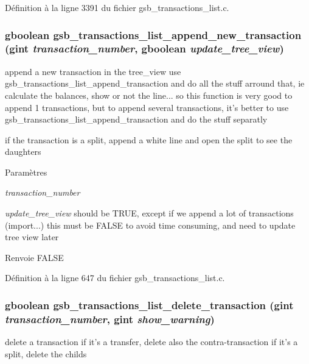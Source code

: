 Définition à la ligne 3391 du fichier gsb\_\-transactions\_\-list.c.

\subsubsection[{gsb\_\-transactions\_\-list\_\-append\_\-new\_\-transaction}]{\setlength{\rightskip}{0pt plus 5cm}gboolean gsb\_\-transactions\_\-list\_\-append\_\-new\_\-transaction (gint {\em transaction\_\-number}, \/  gboolean {\em update\_\-tree\_\-view})}\label{gsb__transactions__list_8h_ab384002f4635a570bc9907b04b3efd24}
append a new transaction in the tree\_\-view use gsb\_\-transactions\_\-list\_\-append\_\-transaction and do all the stuff arround that, ie calculate the balances, show or not the line... so this function is very good to append 1 transactions, but to append several transactions, it's better to use gsb\_\-transactions\_\-list\_\-append\_\-transaction and do the stuff separatly

if the transaction is a split, append a white line and open the split to see the daughters


\begin{DoxyParams}{Paramètres}
\item[{\em transaction\_\-number}]\item[{\em update\_\-tree\_\-view}]should be TRUE, except if we append a lot of transactions (import...) this must be FALSE to avoid time consuming, and need to update tree view later\end{DoxyParams}
\begin{DoxyReturn}{Renvoie}
FALSE 
\end{DoxyReturn}


Définition à la ligne 647 du fichier gsb\_\-transactions\_\-list.c.

\subsubsection[{gsb\_\-transactions\_\-list\_\-delete\_\-transaction}]{\setlength{\rightskip}{0pt plus 5cm}gboolean gsb\_\-transactions\_\-list\_\-delete\_\-transaction (gint {\em transaction\_\-number}, \/  gint {\em show\_\-warning})}\label{gsb__transactions__list_8h_ab0651c16a8ca47b70e7ccdb2d9c18ba1}
delete a transaction if it's a transfer, delete also the contra-\/transaction if it's a split, delete the childs


